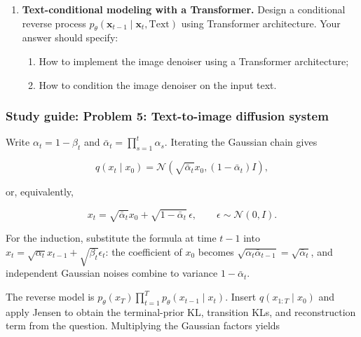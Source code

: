 \documentclass[11pt,a4paper]{article}
\DeclareMathOperator{\E}{\mathbb{E}}
\begin{document}
\begin{enumerate}[label=(\alph*)]
\begin{enumerate}[label=(\roman*)]
\[        \]
        \item Prove that, up to constant and per-timestep weights, training reduces to
        \[
        \mathcal{L}_t = \E_{t, \mathbf{x}_0, \boldsymbol{\epsilon}} \Bigl[ \bigl\| \boldsymbol{\epsilon} - \boldsymbol{\epsilon}_{\theta}\bigl(\sqrt{\bar{\alpha}_t}\, \mathbf{x}_0 + \sqrt{1 - \bar{\alpha}_t}\, \boldsymbol{\epsilon},\, t\bigr) \bigr\|_{2}^{2} \Bigr],
        \]
        where $\boldsymbol{\epsilon} \sim \mathcal{N}(\mathbf{0}, \mathbf{I})$ and $t$ is sampled from a specified distribution over $\{1, \dots, T\}$.
    \end{enumerate}
    \item \textbf{Text-conditional modeling with a Transformer.} Design a conditional reverse process $p_{\theta}(\mathbf{x}_{t-1} \mid \mathbf{x}_t, \mathrm{Text})$ using Transformer architecture. Your answer should specify:
    \begin{enumerate}[label=(\roman*)]
        \item How to implement the image denoiser using a Transformer architecture;
        \item How to condition the image denoiser on the input text.
    \end{enumerate}
\end{enumerate}


\subsubsection{Study guide: Problem 5: Text-to-image diffusion system}

Write $\alpha_t=1-\beta_t$ and $\bar\alpha_t=\prod_{s=1}^t\alpha_s$. Iterating the Gaussian chain gives

\[
q(x_t\mid x_0)=\mathcal{N}\left(\sqrt{\bar\alpha_t}x_0,(1-\bar\alpha_t)I\right),
\]

or, equivalently,

\[
x_t=\sqrt{\bar\alpha_t}x_0+\sqrt{1-\bar\alpha_t}\,\epsilon,
\qquad \epsilon\sim\mathcal{N}(0,I).
\]

For the induction, substitute the formula at time $t-1$ into $x_t=\sqrt{\alpha_t}x_{t-1}+\sqrt{\beta_t}\epsilon_t$: the coefficient of $x_0$ becomes $\sqrt{\alpha_t\bar\alpha_{t-1}}=\sqrt{\bar\alpha_t}$, and independent Gaussian noises combine to variance $1-\bar\alpha_t$.

The reverse model is $p_\theta(x_T)\prod_{t=1}^{T}p_\theta(x_{t-1}\mid x_t)$. Insert $q(x_{1:T}\mid x_0)$ and apply Jensen to obtain the terminal-prior KL, transition KLs, and reconstruction term from the question. Multiplying the Gaussian factors yields
\end{document}
